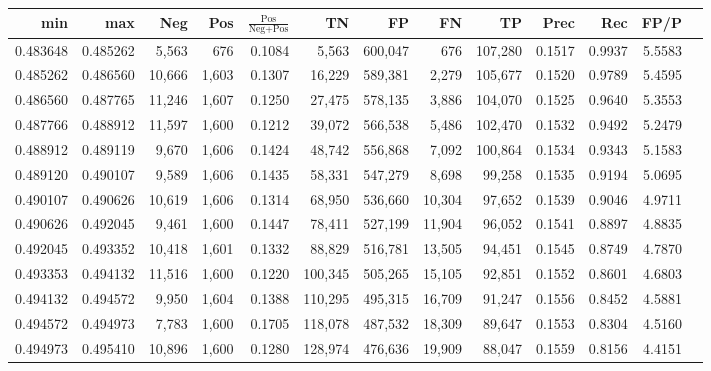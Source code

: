 \begin{tabular}{rrrrrrrrrrrrr}
\toprule
     min &      max &    Neg &   Pos & $\frac{\text{Pos}}{\text{Neg}+\text{Pos}}$ &      TN &      FP &      FN &      TP &   Prec &    Rec &   FP/P \\
\midrule
0.483648 & 0.485262 &  5,563 &   676 &                                     0.1084 &   5,563 & 600,047 &     676 & 107,280 & 0.1517 & 0.9937 & 5.5583 \\
0.485262 & 0.486560 & 10,666 & 1,603 &                                     0.1307 &  16,229 & 589,381 &   2,279 & 105,677 & 0.1520 & 0.9789 & 5.4595 \\
0.486560 & 0.487765 & 11,246 & 1,607 &                                     0.1250 &  27,475 & 578,135 &   3,886 & 104,070 & 0.1525 & 0.9640 & 5.3553 \\
0.487766 & 0.488912 & 11,597 & 1,600 &                                     0.1212 &  39,072 & 566,538 &   5,486 & 102,470 & 0.1532 & 0.9492 & 5.2479 \\
0.488912 & 0.489119 &  9,670 & 1,606 &                                     0.1424 &  48,742 & 556,868 &   7,092 & 100,864 & 0.1534 & 0.9343 & 5.1583 \\
0.489120 & 0.490107 &  9,589 & 1,606 &                                     0.1435 &  58,331 & 547,279 &   8,698 &  99,258 & 0.1535 & 0.9194 & 5.0695 \\
0.490107 & 0.490626 & 10,619 & 1,606 &                                     0.1314 &  68,950 & 536,660 &  10,304 &  97,652 & 0.1539 & 0.9046 & 4.9711 \\
0.490626 & 0.492045 &  9,461 & 1,600 &                                     0.1447 &  78,411 & 527,199 &  11,904 &  96,052 & 0.1541 & 0.8897 & 4.8835 \\
0.492045 & 0.493352 & 10,418 & 1,601 &                                     0.1332 &  88,829 & 516,781 &  13,505 &  94,451 & 0.1545 & 0.8749 & 4.7870 \\
0.493353 & 0.494132 & 11,516 & 1,600 &                                     0.1220 & 100,345 & 505,265 &  15,105 &  92,851 & 0.1552 & 0.8601 & 4.6803 \\
0.494132 & 0.494572 &  9,950 & 1,604 &                                     0.1388 & 110,295 & 495,315 &  16,709 &  91,247 & 0.1556 & 0.8452 & 4.5881 \\
0.494572 & 0.494973 &  7,783 & 1,600 &                                     0.1705 & 118,078 & 487,532 &  18,309 &  89,647 & 0.1553 & 0.8304 & 4.5160 \\
0.494973 & 0.495410 & 10,896 & 1,600 &                                     0.1280 & 128,974 & 476,636 &  19,909 &  88,047 & 0.1559 & 0.8156 & 4.4151 \\

\end{tabular}

